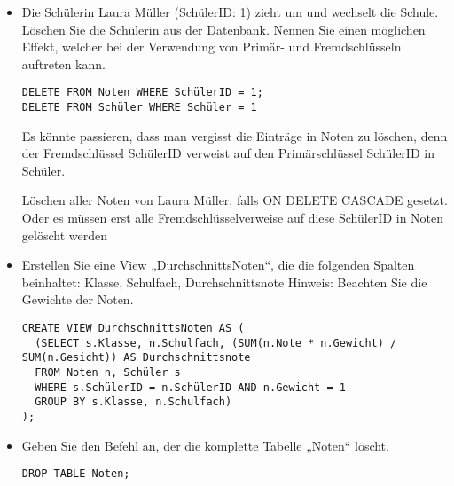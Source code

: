 \documentclass{lehramt-informatik-aufgabe}
\begin{document}
\begin{enumerate}
\begin{itemize}
\item Die Schülerin Laura Müller (SchülerID: 1) zieht um und wechselt
die Schule. Löschen Sie die Schülerin aus der Datenbank. Nennen Sie
einen möglichen Effekt, welcher bei der Verwendung von Primär- und
Fremdschlüsseln auftreten kann.

\begin{antwort}[richtig]
\begin{verbatim}
DELETE FROM Noten WHERE SchülerID = 1;
DELETE FROM Schüler WHERE Schüler = 1
\end{verbatim}

Es könnte passieren, dass man vergisst die Einträge in Noten zu löschen,
denn der Fremdschlüssel SchülerID verweist auf den Primärschlüssel
SchülerID in Schüler.
\end{antwort}

\begin{antwort}[muster]
Löschen aller Noten von Laura Müller, falls ON DELETE CASCADE gesetzt.
Oder es müssen erst alle Fremdschlüsselverweise auf diese SchülerID in
Noten gelöscht werden
\end{antwort}

\item Erstellen Sie eine View „DurchschnittsNoten“, die die folgenden
Spalten beinhaltet: Klasse, Schulfach, Durchschnittsnote Hinweis:
Beachten Sie die Gewichte der Noten.

\begin{antwort}[muster]
\begin{verbatim}
CREATE VIEW DurchschnittsNoten AS (
  (SELECT s.Klasse, n.Schulfach, (SUM(n.Note * n.Gewicht) / SUM(n.Gesicht)) AS Durchschnittsnote
  FROM Noten n, Schüler s
  WHERE s.SchülerID = n.SchülerID AND n.Gewicht = 1
  GROUP BY s.Klasse, n.Schulfach)
);
\end{verbatim}
\end{antwort}

\item Geben Sie den Befehl an, der die komplette Tabelle „Noten“ löscht.

\begin{antwort}[muster]
\begin{verbatim}
DROP TABLE Noten;
\end{verbatim}
\end{antwort}

\end{itemize}



\end{enumerate}
\end{document}
